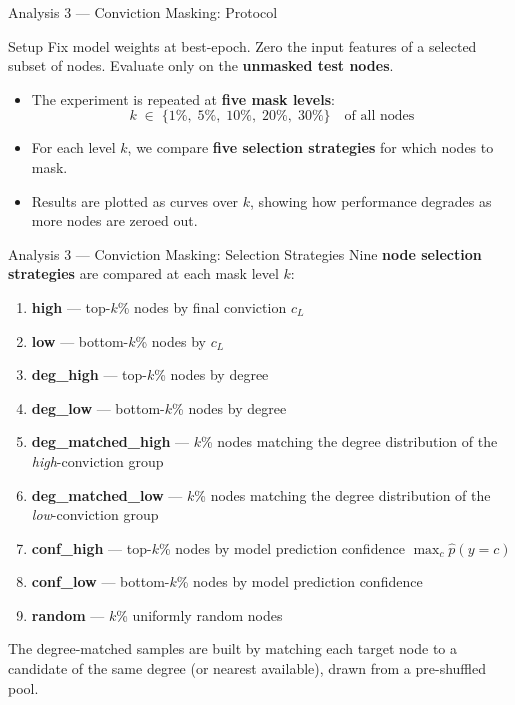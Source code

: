 \documentclass[11pt]{beamer}
\begin{document}
\begin{frame}{Analysis 3 --- Conviction Masking: Protocol}
\begin{block}{Setup}
Fix model weights at best-epoch. Zero the input features of a selected subset of nodes. Evaluate only on the \textbf{unmasked test nodes}.
\end{block}
\bigskip
\begin{itemize}
    \setlength\itemsep{0.8em}
    \item The experiment is repeated at \textbf{five mask levels}:
    \[
        k \;\in\; \{1\%,\; 5\%,\; 10\%,\; 20\%,\; 30\%\} \quad \text{of all nodes}
    \]
    \item For each level $k$, we compare \textbf{five selection strategies} for which nodes to mask.
    \item Results are plotted as curves over $k$, showing how performance degrades as more nodes are zeroed out.
\end{itemize}
\end{frame}


\begin{frame}{Analysis 3 --- Conviction Masking: Selection Strategies}
Nine \textbf{node selection strategies} are compared at each mask level $k$:
\medskip
\begin{enumerate}
    \setlength\itemsep{0.55em}
    \item \textbf{high} --- top-$k$\% nodes by final conviction $c_L$
    \item \textbf{low} --- bottom-$k$\% nodes by $c_L$
    \item \textbf{deg\_high} --- top-$k$\% nodes by degree
    \item \textbf{deg\_low} --- bottom-$k$\% nodes by degree
    \item \textbf{deg\_matched\_high} --- $k$\% nodes matching the degree distribution of the \emph{high}-conviction group
    \item \textbf{deg\_matched\_low} --- $k$\% nodes matching the degree distribution of the \emph{low}-conviction group
    \item \textbf{conf\_high} --- top-$k$\% nodes by model prediction confidence $\max_c \hat{p}(y=c)$
    \item \textbf{conf\_low} --- bottom-$k$\% nodes by model prediction confidence
    \item \textbf{random} --- $k$\% uniformly random nodes
\end{enumerate}
\medskip
\small The degree-matched samples are built by matching each target node to a candidate of the same degree (or nearest available), drawn from a pre-shuffled pool.
\end{frame}
\end{document}
